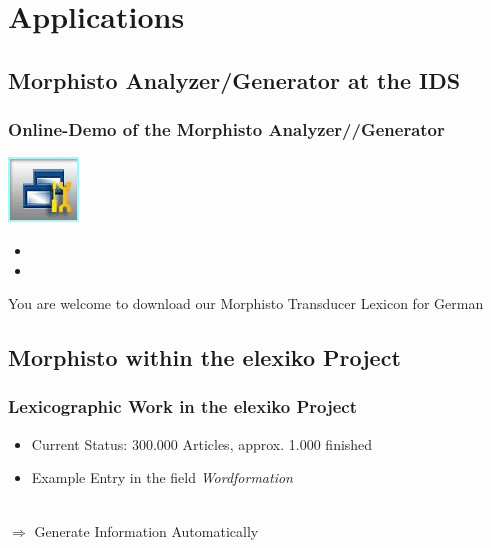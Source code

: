 \documentclass {beamer}
\begin{document}
\section{Applications}

\subsection{Morphisto Analyzer/Generator at the IDS}
\frame
{  
	\frametitle{Online-Demo of the Morphisto Analyzer//Generator}
\includegraphics[scale=0.75]{Workbench.jpg} \\
 \begin{itemize}
\item  {}
\item  {} 
\end{itemize}
You are welcome to download our Morphisto Transducer Lexicon for German 
}

\subsection{Morphisto within the elexiko Project}
\frame
{
  \frametitle{Lexicographic Work in the elexiko Project}
  
\begin{itemize}
 \item Current Status: 300.000 Articles, approx. 1.000 finished
 \item Example Entry in the field \textit{Wordformation} \\
  \\
\end{itemize}
$\Longrightarrow$ Generate Information Automatically
}
\end{document}
